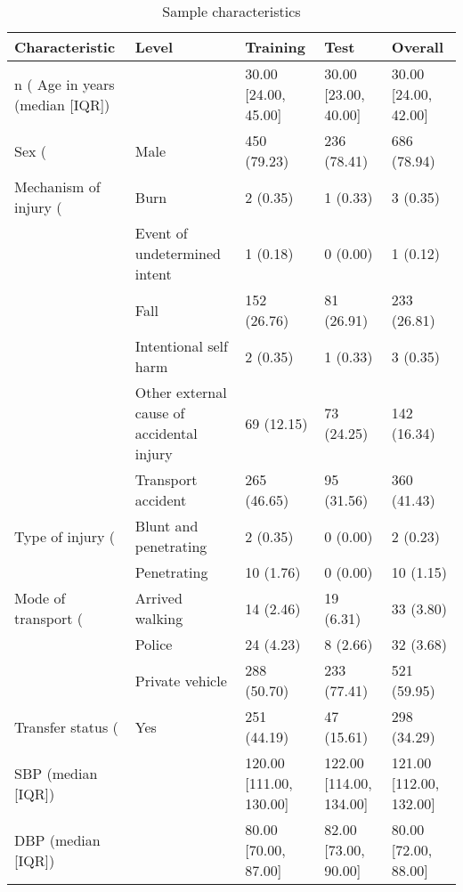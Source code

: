 \documentclass[10pt,letterpaper]{article}\usepackage[]{graphicx}\usepackage[]{color}
\begin{document}
\begin{table}[ht]
\centering
\caption{Sample characteristics} 
\begin{tabular}{lllll}
  \hline
Characteristic & Level & Training & Test & Overall \\ 
  \hline
n (%
  Age in years (median [IQR]) &  & 30.00 [24.00, 45.00] & 30.00 [23.00, 40.00] & 30.00 [24.00, 42.00] \\ 
  Sex (%
   & Male & 450 (79.23) & 236 (78.41) & 686 (78.94) \\ 
  Mechanism of injury (%
   & Burn & 2 (0.35) & 1 (0.33) & 3 (0.35) \\ 
   & Event of undetermined intent & 1 (0.18) & 0 (0.00) & 1 (0.12) \\ 
   & Fall & 152 (26.76) & 81 (26.91) & 233 (26.81) \\ 
   & Intentional self harm & 2 (0.35) & 1 (0.33) & 3 (0.35) \\ 
   & Other external cause of accidental injury & 69 (12.15) & 73 (24.25) & 142 (16.34) \\ 
   & Transport accident & 265 (46.65) & 95 (31.56) & 360 (41.43) \\ 
  Type of injury (%
   & Blunt and penetrating & 2 (0.35) & 0 (0.00) & 2 (0.23) \\ 
   & Penetrating & 10 (1.76) & 0 (0.00) & 10 (1.15) \\ 
  Mode of transport (%
   & Arrived walking & 14 (2.46) & 19 (6.31) & 33 (3.80) \\ 
   & Police & 24 (4.23) & 8 (2.66) & 32 (3.68) \\ 
   & Private vehicle & 288 (50.70) & 233 (77.41) & 521 (59.95) \\ 
  Transfer status (%
   & Yes & 251 (44.19) & 47 (15.61) & 298 (34.29) \\ 
  SBP (median [IQR]) &  & 120.00 [111.00, 130.00] & 122.00 [114.00, 134.00] & 121.00 [112.00, 132.00] \\ 
  DBP (median [IQR]) &  & 80.00 [70.00, 87.00] & 82.00 [73.00, 90.00] & 80.00 [72.00, 88.00] \\ 

\end{tabular}
\end{table}
\end{document}
